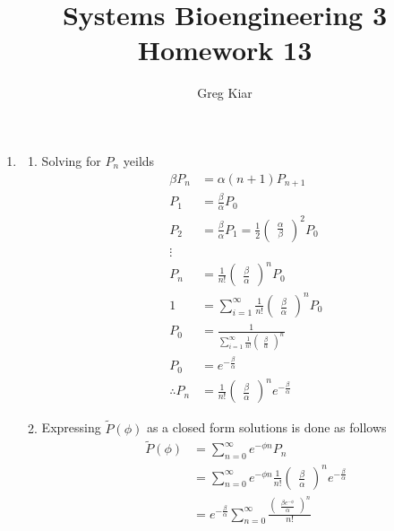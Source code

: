 \documentclass[10pt]{article}
\begin{document}
\title{ \vspace{-30mm}Systems Bioengineering 3\\Homework 13}
\author{Greg Kiar}

\maketitle
\begin{enumerate}
\item
\begin{enumerate}
\item Solving for $P_n$ yeilds
\begin{align*}
\beta P_n &= \alpha(n+1) P_{n+1} \\
P_1 &= \frac{\beta}{\alpha}P_{0}\\
P_2 &= \frac{\beta}{\alpha}P_{1} =  \frac{1}{2}\begin{pmatrix}\frac{\alpha}{\beta} \end{pmatrix}^2P_0 \\
\vdots \\
P_n &= \frac{1}{n!} \begin{pmatrix} \frac{\beta}{\alpha}\end{pmatrix}^n P_0 \\
1 &= \sum_{i=1}^{\infty}  \frac{1}{n!} \begin{pmatrix} \frac{\beta}{\alpha}\end{pmatrix}^n P_0\\
P_0 &= \frac{1}{\sum_{i=1}^{\infty}  \frac{1}{n!} \begin{pmatrix} \frac{\beta}{\alpha}\end{pmatrix}^n} \\
P_0 &= e^{-\frac{\beta}{\alpha}}\\
\therefore P_n &= \frac{1}{n!} \begin{pmatrix} \frac{\beta}{\alpha}\end{pmatrix}^n e^{-\frac{\beta}{\alpha}}
\end{align*}
\item Expressing $\tilde{P}(\phi)$ as a closed form solutions is done as follows
\begin{align*}
\tilde{P}(\phi) &= \sum_{n=0}^{\infty}e^{-\phi n}P_n \\
&= \sum_{n=0}^{\infty}e^{-\phi n} \frac{1}{n!} \begin{pmatrix} \frac{\beta}{\alpha}\end{pmatrix}^n e^{-\frac{\beta}{\alpha}}\\
&= e^{-\frac{\beta}{\alpha}} \sum_{n=0}^{\infty} \frac{\begin{pmatrix}\frac{\beta e^{-\phi}}{\alpha}\end{pmatrix}^{n}}{n!}  \\

\end{align*}
\end{enumerate}
\end{enumerate}
\end{document}
